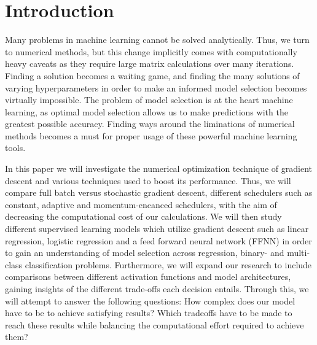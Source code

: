 \documentclass[onecolumn,10pt,cleanfoot]{asme2ej}
\begin{document}
%

\section{Introduction}

Many problems in machine learning cannot be solved analytically. Thus, we turn to numerical methods, but this change implicitly comes with computationally heavy caveats as they require large matrix calculations over many iterations. Finding a solution becomes a waiting game, and finding the many solutions of varying hyperparameters in order to make an informed model selection becomes virtually impossible. The problem of model selection is at the heart machine learning, as optimal model selection allows us to make predictions with the greatest possible accuracy. Finding ways around the liminations of numerical methods becomes a must for proper usage of these powerful machine learning tools.

In this paper we will investigate the numerical optimization technique of gradient descent and various techniques used to boost its performance. Thus, we will compare full batch versus stochastic gradient descent, different schedulers such as constant, adaptive and momentum-encanced schedulers, with the aim of decreasing the computational cost of our calculations. We will then study different supervised learning models which utilize gradient descent such as linear regression, logistic regression and a feed forward neural network (FFNN) in order to gain an understanding of model selection across regression, binary- and multi-class classification problems. Furthermore, we will expand our research to include comparisons between different activation functions and model architectures, gaining insights of the different trade-offs each decision entails. Through this, we will attempt to answer the following questions: How complex does our model have to be to achieve satisfying results? Which tradeoffs have to be made to reach these results while balancing the computational effort required to achieve them?
\end{document}
